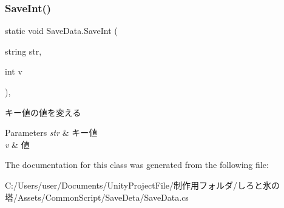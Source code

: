 \subsubsection{\texorpdfstring{Save\+Int()}{SaveInt()}}
{\footnotesize\ttfamily static void Save\+Data.\+Save\+Int (\begin{DoxyParamCaption}\item[{string}]{str,  }\item[{int}]{v }\end{DoxyParamCaption})\hspace{0.3cm}{\ttfamily [inline]}, {\ttfamily [static]}}



キー値の値を変える 


\begin{DoxyParams}{Parameters}
{\em str} & キー値\\
\hline
{\em v} & 値\\
\hline
\end{DoxyParams}


The documentation for this class was generated from the following file\+:\begin{DoxyCompactItemize}
\item 
C\+:/\+Users/user/\+Documents/\+Unity\+Project\+File/制作用フォルダ/しろと氷の塔/\+Assets/\+Common\+Script/\+Save\+Deta/Save\+Data.\+cs\end{DoxyCompactItemize}
